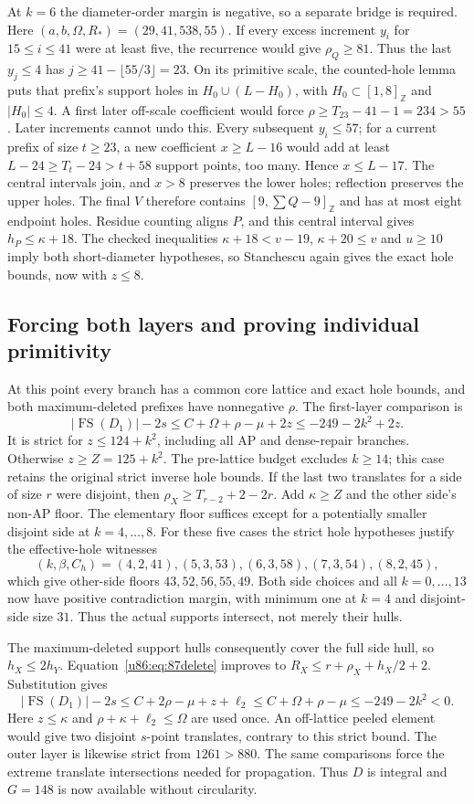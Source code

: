 \documentclass[11pt,a4paper]{article}
\theoremstyle{remark}
\newcommand{\FS}{\operatorname{FS}}
\newcommand{\Z}{\mathbb Z}
\begin{document}
At $k=6$ the diameter-order margin is negative, so a separate bridge
is required. Here $(a,b,\Omega,R_*)=(29,41,538,55)$. If every excess
increment $y_i$ for $15\le i\le41$ were at least five, the recurrence
would give $\rho_Q\ge81$. Thus the last $y_j\le4$ has
$j\ge41-\lfloor55/3\rfloor=23$. On its primitive scale, the
counted-hole lemma puts that prefix's support holes in
$H_0\cup(L-H_0)$, with $H_0\subset[1,8]_{\Z}$ and $|H_0|\le4$.
A first later off-scale coefficient would force
$\rho\ge T_{23}-41-1=234>55$. Later increments cannot undo this.
Every subsequent $y_i\le57$; for a current prefix of size $t\ge23$,
a new coefficient $x\ge L-16$ would add at least
$L-24\ge T_t-24>t+58$ support points, too many. Hence $x\le L-17$.
The central intervals join, and $x>8$ preserves the lower holes;
reflection preserves the upper holes. The final $V$ therefore contains
$[9,\sum Q-9]_{\Z}$ and has at most eight endpoint holes.
Residue counting aligns $P$, and this central interval gives
$h_P\le\kappa+18$. The checked inequalities
$\kappa+18<v-19$, $\kappa+20\le v$ and $u\ge10$ imply both
short-diameter hypotheses, so Stanchescu again gives the exact hole
bounds, now with $z\le8$.

\subsection{Forcing both layers and proving individual primitivity}
At this point every branch has a common core lattice and exact hole
bounds, and both maximum-deleted prefixes have nonnegative $\rho$.
The first-layer comparison is
\[
 |\FS(D_1)|-2s\le C+\Omega+\rho-\mu+2z
 \le-249-2k^2+2z.
\]
It is strict for $z\le124+k^2$, including all AP and dense-repair
branches. Otherwise $z\ge Z=125+k^2$. The pre-lattice budget excludes
$k\ge14$; this case retains the original strict inverse hole bounds.
If the last two translates for a side of size $r$ were disjoint, then
$\rho_X\ge T_{r-2}+2-2r$. Add $\kappa\ge Z$ and the other side's
non-AP floor. The elementary floor suffices except for a potentially
smaller disjoint side at $k=4,\ldots,8$. For these five cases the strict
hole hypotheses justify the effective-hole witnesses
\[
 (k,\beta,C_h)=(4,2,41),(5,3,53),(6,3,58),(7,3,54),(8,2,45),
\]
which give other-side floors $43,52,56,55,49$. Both side choices and
all $k=0,\ldots,13$ now have positive contradiction margin, with
minimum one at $k=4$ and disjoint-side size $31$. Thus the actual
supports intersect, not merely their hulls.

The maximum-deleted support hulls consequently cover the full side
hull, so $h_X\le2h_Y$. Equation~\eqref{u86:eq:87delete} improves to
$R_X\le r+\rho_X+h_X/2+2$. Substitution gives
\[
 |\FS(D_1)|-2s\le C+2\rho-\mu+z+\ell_2
 \le C+\Omega+\rho-\mu\le-249-2k^2<0.
\]
Here $z\le\kappa$ and $\rho+\kappa+\ell_2\le\Omega$ are used once.
An off-lattice peeled element would give two disjoint $s$-point
translates, contrary to this strict bound. The outer layer is likewise
strict from $1261>880$. The same comparisons force the extreme
translate intersections needed for propagation. Thus $D$ is integral
and $G=148$ is now available without circularity.
\end{document}
